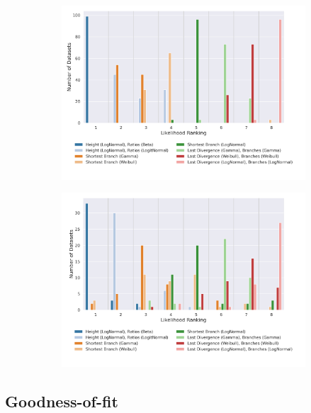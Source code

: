\documentclass[10pt,letterpaper]{article}
\begin{document}
\begin{figure}
	\begin{subfigure}[b]{0.4\textwidth}
		\centering
		\includegraphics[width=\textwidth]{figures/yule-400-ccd1-likelihood-ranking.png}
	\end{subfigure}
	\begin{subfigure}[b]{0.4\textwidth}
		\centering
		\includegraphics[width=\textwidth]{figures/bio-ccd1-likelihood-ranking.png}
	\end{subfigure}
	
	\label{fig:data-likelihood-ranking}
\end{figure}

\subsection*{Goodness-of-fit}
\end{document}
